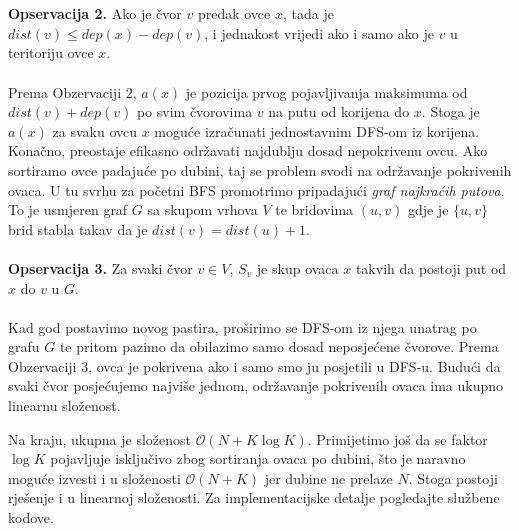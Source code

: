 \\\\
\textbf{Opservacija 2.} Ako je čvor $v$ predak ovce $x$, tada je $dist(v) \leq dep(x) - dep(v)$, i jednakost vrijedi ako i samo ako je $v$ u teritoriju ovce $x$.
\\\\
Prema Obzervaciji $2$, $a(x)$ je pozicija prvog pojavljivanja maksimuma od $dist(v) + dep(v)$ po svim čvorovima $v$ na putu od korijena do $x$. Stoga je $a(x)$ za svaku ovcu $x$ moguće izračunati jednostavnim DFS-om iz korijena. Konačno, preostaje efikasno održavati najdublju dosad nepokrivenu ovcu. Ako sortiramo ovce padajuće po dubini, taj se problem svodi na održavanje pokrivenih ovaca. U tu svrhu za početni BFS promotrimo pripadajući \emph{graf najkraćih putova}. To je usmjeren graf $G$ sa skupom vrhova $V$ te bridovima $(u, v)$ gdje je $\{u, v\}$ brid stabla takav da je $dist(v) = dist(u) + 1$.
\\\\
\textbf{Opservacija 3.} Za svaki čvor $v \in V$, $S_v$ je skup ovaca $x$ takvih da postoji put od $x$ do $v$ u $G$.
\\\\
Kad god postavimo novog pastira, proširimo se DFS-om iz njega unatrag po grafu $G$ te pritom pazimo da obilazimo samo dosad neposjećene čvorove. Prema Obzervaciji 3, ovca je pokrivena ako i samo smo ju posjetili u DFS-u. Budući da svaki čvor posjećujemo najviše jednom, održavanje pokrivenih ovaca ima ukupno linearnu složenost.

Na kraju, ukupna je složenost $\mathcal{O}(N + K\log K)$. Primijetimo još da se faktor $\log K$ pojavljuje isključivo zbog sortiranja ovaca po dubini, što je naravno moguće izvesti i u složenosti $\mathcal{O}(N + K)$ jer dubine ne prelaze $N$. Stoga postoji rješenje i u linearnoj složenosti. Za implementacijske detalje pogledajte službene kodove.
